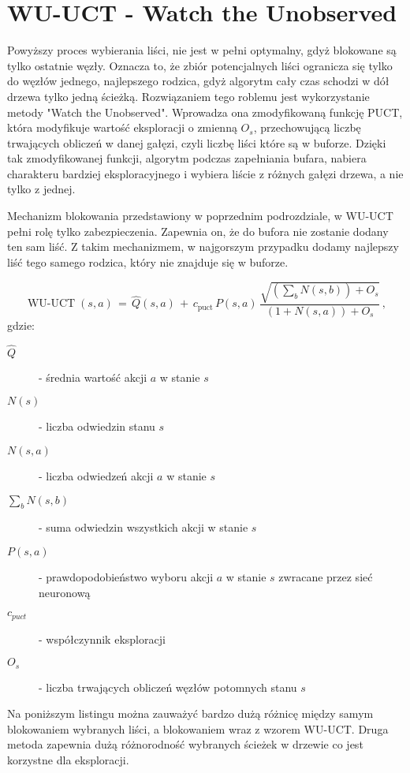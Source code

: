 \section*{WU-UCT - Watch the Unobserved}
Powyższy proces wybierania liści, nie jest w pełni optymalny, gdyż blokowane są tylko ostatnie węzły. Oznacza to, że zbiór potencjalnych liści ogranicza się tylko do węzłów jednego, najlepszego rodzica, gdyż algorytm cały czas schodzi w dół drzewa tylko jedną ścieżką. Rozwiązaniem tego roblemu jest wykorzystanie metody "Watch the Unobserved". Wprowadza ona zmodyfikowaną funkcję PUCT, która modyfikuje wartość eksploracji o zmienną $O_s$, przechowującą liczbę trwających obliczeń w danej gałęzi, czyli liczbę liści które są w buforze. Dzięki tak zmodyfikowanej funkcji, algorytm podczas zapełniania bufara, nabiera charakteru bardziej eksploracyjnego i wybiera liście z różnych gałęzi drzewa, a nie tylko z jednej.

Mechanizm blokowania przedstawiony w poprzednim podrozdziale, w WU-UCT pełni rolę tylko zabezpieczenia. Zapewnia on, że do bufora nie zostanie dodany ten sam liść. Z takim mechanizmem, w najgorszym przypadku dodamy najlepszy liść tego samego rodzica, który nie znajduje się w buforze.

\begin{equation}
\operatorname{WU-UCT}(s,a) \,=\, \widehat{Q}(s,a) \, + \, c_{\mathrm{puct}}\, P(s,a)\, \frac{\sqrt{(\sum_{b} N(s,b)) + O_s}}{(1 + N(s,a)) + O_s}\, ,
\end{equation}
\noindent gdzie:
\begin{description}
  \item[$\widehat{Q}$] - średnia wartość akcji $a$ w stanie $s$
  \item[$N(s)$] - liczba odwiedzin stanu $s$
  \item[$N(s,a)$] - liczba odwiedzeń akcji $a$ w stanie $s$
  \item[$\sum_{b} N(s,b)$] - suma odwiedzin wszystkich akcji w stanie $s$
  \item[$P(s,a)$] - prawdopodobieństwo wyboru akcji $a$ w stanie $s$ zwracane przez sieć neuronową
  \item[$c_{puct}$] - współczynnik eksploracji
  \item[$O_s$] - liczba trwających obliczeń węzłów potomnych stanu $s$
\end{description}

Na poniższym listingu można zauważyć bardzo dużą różnicę między samym blokowaniem wybranych liści, a blokowaniem wraz z wzorem WU-UCT. Druga metoda zapewnia dużą różnorodność wybranych ścieżek w drzewie co jest korzystne dla eksploracji.

